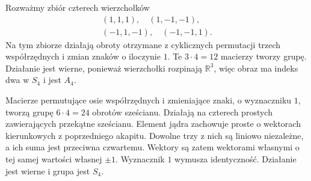 \begin{przyklad}
\label{aa:prz:pgl2-tetra-cube}
Rozważmy zbiór czterech wierzchołków
\[
 \begin{gathered}
 (1,1,1),\quad(1,-1,-1),\\
 (-1,1,-1),\quad(-1,-1,1).
 \end{gathered}
\]
Na tym zbiorze działają obroty otrzymane z cyklicznych permutacji
trzech współrzędnych i zmian znaków o iloczynie $1$.
Te $3\cdot4=12$ macierzy tworzy grupę.
Działanie jest wierne, ponieważ wierzchołki rozpinają
$\mathbb R^3$, więc obraz ma indeks dwa w $S_4$
i jest $A_4$.

Macierze permutujące osie współrzędnych i zmieniające znaki,
o wyznaczniku $1$, tworzą grupę $6\cdot4=24$ obrotów
sześcianu. Działają na czterech prostych zawierających
przekątne sześcianu. Element jądra zachowuje proste
o wektorach kierunkowych z poprzedniego akapitu.
Dowolne trzy z nich są liniowo niezależne, a ich suma
jest przeciwna czwartemu. Wektory są zatem wektorami
własnymi o tej samej wartości własnej $\pm1$.
Wyznacznik $1$ wymusza identyczność.
Działanie jest wierne i grupa jest $S_4$.
\end{przyklad}

